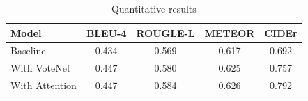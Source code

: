 \documentclass[10pt,twocolumn,letterpaper]{article}
\begin{document}
\begin{table}
	\centering
	\begin{tabular}{l|cccc}
		\textbf{Model} & \textbf{BLEU-4} & \textbf{ROUGLE-L} & \textbf{METEOR} & \textbf{CIDEr}\\
		\hline
		Baseline & 0.434 & 0.569 & 0.617 & 0.692 \\
		With VoteNet & 0.447 & 0.580 & 0.625 & 0.757 \\
		With Attention & 0.447 & 0.584 & 0.626 & 0.792  
	\end{tabular}
	\caption{Quantitative results}
	\label{tab:quantitative_results}
\end{table}

{\small


}
\end{document}
